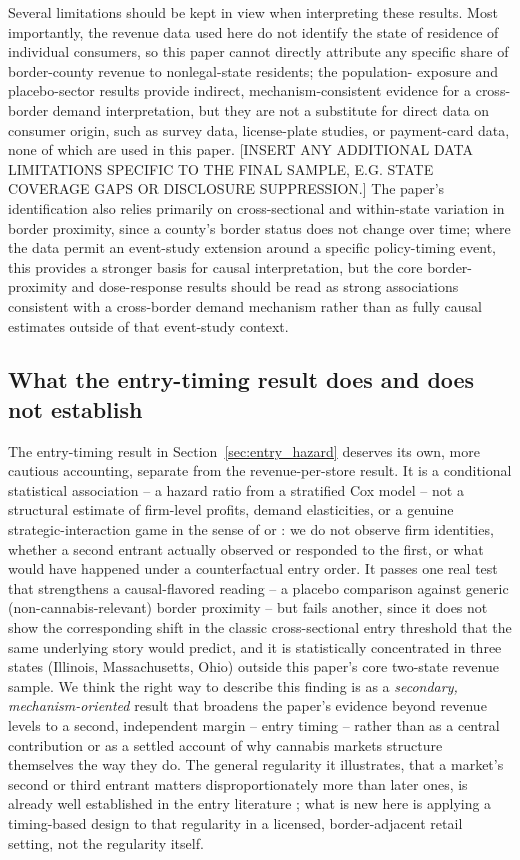 \documentclass[12pt]{article}
\begin{document}
Several limitations should be kept in view when interpreting these results. Most importantly, the revenue
data used here do not identify the state of residence of individual consumers, so this paper cannot
directly attribute any specific share of border-county revenue to nonlegal-state residents; the population-
exposure and placebo-sector results provide indirect, mechanism-consistent evidence for a cross-border
demand interpretation, but they are not a substitute for direct data on consumer origin, such as survey
data, license-plate studies, or payment-card data, none of which are used in this paper. [INSERT ANY
ADDITIONAL DATA LIMITATIONS SPECIFIC TO THE FINAL SAMPLE, E.G. STATE COVERAGE GAPS OR DISCLOSURE
SUPPRESSION.] The paper's identification also relies primarily on cross-sectional and within-state variation
in border proximity, since a county's border status does not change over time; where the data permit an
event-study extension around a specific policy-timing event, this provides a stronger basis for causal
interpretation, but the core border-proximity and dose-response results should be read as strong
associations consistent with a cross-border demand mechanism rather than as fully causal estimates outside
of that event-study context.

\subsection{What the entry-timing result does and does not establish}
\label{sec:discussion_timing}

The entry-timing result in Section~\ref{sec:entry_hazard} deserves its own, more cautious accounting,
separate from the revenue-per-store result. It is a conditional statistical association -- a hazard ratio
from a stratified Cox model -- not a structural estimate of firm-level profits, demand elasticities, or a
genuine strategic-interaction game in the sense of \citet{Berry1992} or \citet{Seim2006}: we do not observe
firm identities, whether a second entrant actually observed or responded to the first, or what would have
happened under a counterfactual entry order. It passes one real test that strengthens a causal-flavored
reading -- a placebo comparison against generic (non-cannabis-relevant) border proximity -- but fails
another, since it does not show the corresponding shift in the classic cross-sectional entry threshold that
the same underlying story would predict, and it is statistically concentrated in three states (Illinois,
Massachusetts, Ohio) outside this paper's core two-state revenue sample. We think the right way to describe
this finding is as a \emph{secondary, mechanism-oriented} result that broadens the paper's evidence beyond
revenue levels to a second, independent margin -- entry timing -- rather than as a central contribution or
as a settled account of why cannabis markets structure themselves the way they do. The general regularity it
illustrates, that a market's second or third entrant matters disproportionately more than later ones, is
already well established in the entry literature \citep{BresnahanReiss1990,BresnahanReiss1991}; what is new
here is applying a timing-based design to that regularity in a licensed, border-adjacent retail setting, not
the regularity itself.
\end{document}
